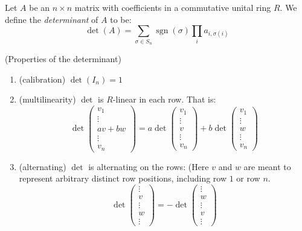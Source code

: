 

\newcommand{\sgn}{\operatorname{sgn}}

\begin{definition}  Let $A$ be an $n \times n$ matrix with coefficients in a commutative unital ring $R$.  
	We define the {\it determinant} of $A$ to be:
	$$\det(A) = \sum_{\sigma \in S_n} \sgn(\sigma) \prod_i a_{i,\sigma(i)}$$
\end{definition}



\begin{theorem} (Properties of the determinant)
	\begin{enumerate}\setlength{\itemsep}{0em}
		\item (calibration) \label{calibration} $\det(I_n)=1$
		\item (multilinearity) \label{multilinear} $\det$ is $R$-linear in each row.  That is: $$\det\left(\begin{array}{c} v_1 \\ \vdots \\av+bw \\ \vdots \\v_n \end{array}\right) =a \det\left(\begin{array}{c} v_1 \\ \vdots \\ v \\ \vdots \\ v_n \end{array}\right) + b\det\left(\begin{array}{c} v_1 \\ \vdots \\ w \\ \vdots \\ v_n \end{array}\right)$$
		\item (alternating) \label{alternating} $\det$ is alternating on the rows:  (Here $v$ and $w$ are meant to represent arbitrary distinct row positions, including row $1$ or row $n$.
		$$\det\left(\begin{array}{c} \vdots \\ v \\ \vdots \\w \\ \vdots \end{array}\right) = - \det\left(\begin{array}{c} \vdots \\ w \\ \vdots \\ v \\ \vdots  \end{array}\right)$$

\end{enumerate}
\end{theorem}
